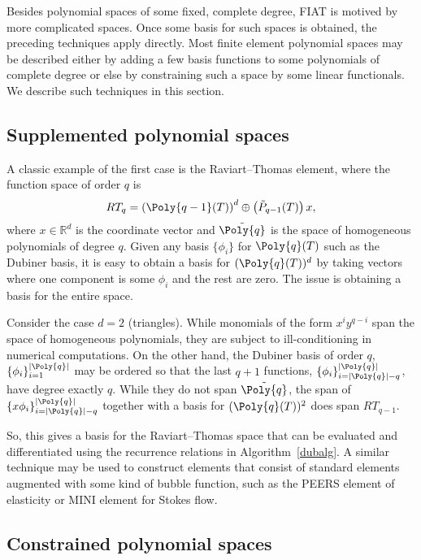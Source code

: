 Besides polynomial spaces of some fixed, complete degree, FIAT is motived
by more complicated spaces.  Once some basis for such spaces is obtained,
the preceding techniques apply directly.  Most finite element polynomial
spaces may be described either by adding a few basis functions to some
polynomials of complete degree or else by constraining such a space by
some linear functionals.  We describe such techniques in this section.

\subsection{Supplemented polynomial spaces}

A classic example of the first case is the Raviart--Thomas element,
where the function space of order \(q \) is\vspace*{4pt}
\[
RT_q = \left( \Poly{q-1}(T) \right)^d \oplus \left( \tilde{P}_{q-1}(T) \right) x,\vspace*{2pt}
\]
where \(x \in \mathbb{R}^d\) is the coordinate vector and \( \tilde{\Poly{q}}
\) is the space of homogeneous polynomials of degree \( q \).  Given any
basis \( \{ \phi_i \} \) for \( \Poly{q}(T) \) such as the Dubiner basis, it
is easy to obtain a basis for \( (\Poly{q}(T))^d \) by taking vectors where
one component is some \( \phi_i \) and the rest are zero.  The issue is
obtaining a basis for the entire space.

Consider the case \( d = 2 \) (triangles).  While monomials of the form
\( x^i y^{q-i} \) span the space of homogeneous polynomials, they are
subject to ill-conditioning in numerical computations.  On the other
hand, the Dubiner basis of order \( q \), \( \{ \phi_i \}_{i=1}^{|\Poly{q}|}
\) may be ordered so that the last \( q + 1 \) functions, \( \{ \phi_i
\}_{i=|\Poly{q}|-q}^{|\Poly{q}|} \), have degree exactly \( q \).  While they do not
span \( \tilde{\Poly{q}} \), the span of \( \{ x \phi_i \}_{i=|\Poly{q}|-q}^{|\Poly{q}|}
\) together with a basis for \( (\Poly{q}(T))^2 \) does span \( RT_{q-1} \).

So, this gives a basis for the Raviart--Thomas space that can be
evaluated and differentiated using the recurrence relations in
Algorithm~\ref{dubalg}.  A similar technique may be used to construct
elements that consist of standard elements augmented with some kind of
bubble function, such as the PEERS element of elasticity or MINI
element for Stokes flow.

\subsection{Constrained polynomial spaces}

